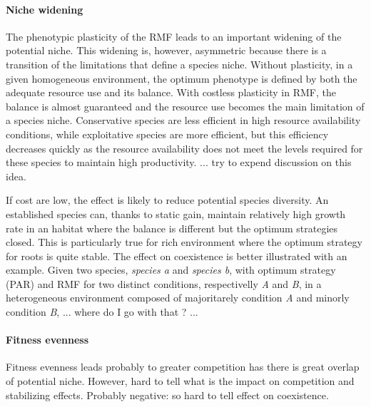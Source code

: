 \paragraph{Niche widening}

The phenotypic plasticity of the RMF leads to an important widening of the potential niche. This widening is, however, asymmetric because there is a transition of the limitations that define a species niche. Without plasticity, in a given homogeneous environment, the optimum phenotype is defined by both the adequate resource use and its balance. With costless plasticity in RMF, the balance is almost guaranteed and the resource use becomes the main limitation of a species niche. Conservative species are less efficient in high resource availability conditions, while exploitative species are more efficient, but this efficiency decreases quickly as the resource availability does not meet the levels required for these species to maintain high productivity.
 ... try to expend discussion on this idea.
 
 If cost are low, the effect is likely to reduce potential species diversity. An established species can, thanks to static gain, maintain relatively high growth rate in an habitat where the balance is different but the optimum strategies closed. This is particularly true for rich environment where the optimum strategy for roots is quite stable. The effect on coexistence is better illustrated with an example. Given two species, \textit{species a} and \textit{species b}, with optimum strategy (PAR) and RMF for two distinct conditions, respectivelly \textit{A} and \textit{B}, in a heterogeneous environment composed of majoritarely condition \textit{A} and minorly condition \textit{B}, ... where do I go with that ? ... 


\paragraph{Fitness evenness}

Fitness evenness leads probably to greater competition has there is great overlap of potential niche. However, hard to tell what is the impact on competition and stabilizing effects. Probably negative: so hard to tell effect on coexistence.

